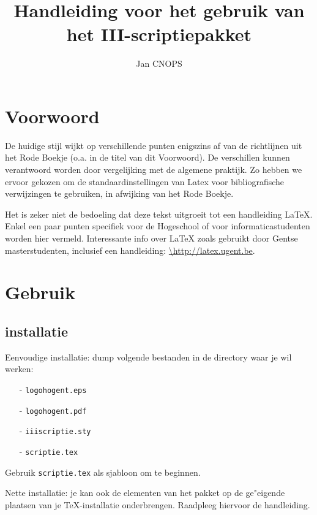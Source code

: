 \documentclass[a4paper,oneside]{book}
\title{Handleiding voor het gebruik van het III-scriptiepakket}
\author{Jan CNOPS}
\begin{document}
\maketitle
{}
\tableofcontents
{}
\chapter*{Voorwoord}
%
%
De huidige stijl wijkt op verschillende punten enigszins af van de richtlijnen uit het
Rode Boekje (o.a. in de titel van dit Voorwoord). De verschillen kunnen verantwoord
worden door vergelijking met de algemene praktijk. Zo hebben we ervoor gekozen om de
standaardinstellingen van Latex voor bibliografische verwijzingen te gebruiken, in
afwijking van het Rode Boekje.

Het is zeker niet de bedoeling dat deze tekst uitgroeit tot een handleiding LaTeX. Enkel
een paar punten specifiek voor de Hogeschool of voor informaticastudenten worden hier
vermeld. Interessante info over LaTeX zoals gebruikt door Gentse masterstudenten,
inclusief een handleiding:
\url{\http://latex.ugent.be}.
\chapter{Gebruik}
\section{installatie}
Eenvoudige installatie: dump volgende bestanden in de directory waar je wil werken:
\begin{enumerate}
\item[-]\texttt{logohogent.eps}
\item[-]\texttt{logohogent.pdf}
\item[-]\texttt{iiiscriptie.sty}
\item[-]\texttt{scriptie.tex}
\end{enumerate}
Gebruik \texttt{scriptie.tex} als sjabloon om te beginnen.

Nette installatie: je kan ook de elementen van het pakket op de ge"eigende plaatsen van
je \TeX-installatie onderbrengen. Raadpleeg hiervoor de handleiding.
\end{document}
